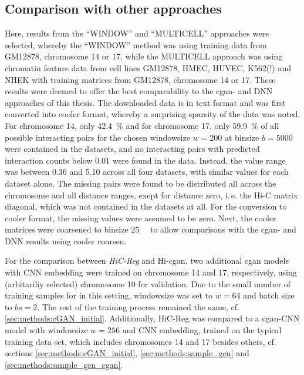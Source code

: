 \subsection{Comparison with other approaches} \label{sec:methods:comparison}
Here, results from the ``WINDOW'' and ``MULTICELL'' approaches were selected, whereby the ``WINDOW'' method was using training data from GM12878, chromosome 14 or 17, 
while the MULTICELL approach was using chromatin feature data from cell lines GM12878, HMEC, HUVEC, K562(!) and NHEK with training matrices from GM12878, chromosome 14 or 17.
These results were deemed to offer the best comparability to the \acrshort{cgan}- and DNN approaches of this thesis.
The downloaded data is in text format and was first converted into cooler format, whereby a surprising sparsity of the data was noted.
For chromosome 14, only \SI{42.4}{\percent} and for chromosome 17, only \SI{59.9}{\percent} of all possible interacting pairs 
for the chosen windowsize $w=200$ at binsize $b=5000$ were contained in the datasets, 
and no interacting pairs with predicted interaction counts below 0.01 were found in the data. 
Instead, the value range was between 0.36 and 5.10 across all four datasets, with similar values for each dataset alone.
The missing pairs were found to be distributed all across the chromosome and all distance ranges, exept for distance zero, i.\,e. the Hi-C matrix diagonal, which was not contained in the datasets at all.
For the conversion to cooler format, the missing values were assumed to be zero.
Next, the cooler matrices were coarsened to binsize \SI{25}{\kilo\bp} to allow comparisons with the \acrshort{cgan}- and DNN results using cooler coarsen.

For the comparison between \emph{HiC-Reg} and Hi-\acrshort{cgan}, two additional \acrshort{cgan} models with CNN embedding were trained on chromosome 14 and 17, respectively,
using (arbitariliy selected) chromosome 10 for validation. 
Due to the small number of training samples for in this setting, windowsize was set to $w=64$ and batch size to $bs=2$.
The rest of the training process remained the same, cf. \cref{sec:methods:cGAN_initial}.
Additionally, HiC-Reg was compared to a \acrshort{cgan}-CNN model with windowsize $w=256$ and CNN embedding, trained on the typical training data set, 
which includes chromosomes 14 and 17 besides others, cf. sections \ref{sec:methods:cGAN_initial}, \ref{sec:methods:sample_gen} and \ref{sec:methods:sample_gen_cgan}.

